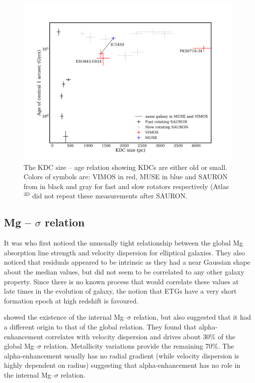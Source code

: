 		\begin{figure}
			\centering
			\includegraphics[width=.7\textwidth]{chapter4/KDC_size_age.png}
			\caption[KDC dichotomy]{The KDC size -- age relation showing KDCs are either old or small. Colors of symbols are: VIMOS in red, MUSE in blue and SAURON from \citet{Kuntschner2010} in black and gray for fast and slow rotators respectively (Atlas$^\text{3D}$ did not repeat these measurements after SAURON.}
			\label{fig:KDC}
		\end{figure}


	\subsection{Mg -- $\sigma$ relation}
		\label{subsec:Mgsigma}

		It was \citet{Bender1993} who first noticed the unusually tight relationship between the global Mg absorption line strength and velocity dispersion for elliptical galaxies. They also noticed that residuals appeared to be intrinsic as they had a near Gaussian shape about the median values, but did not seem to be correlated to any other galaxy property. Since there is no known process that would correlate these values at late times in the evolution of galaxy, the notion that ETGs have a very short formation epoch at high redshift is favoured. 

		\citet{Mehlert2003} showed the existence of the internal Mg--$\mathrm{\sigma}$ relation, but also suggested that it had a different origin to that of the global relation. They found that alpha-enhancement correlates with velocity dispersion and drives about 30\% of the global Mg--$\sigma$ relation. Metallicity variations provide the remaining 70\%. The alpha-enhancement usually has no radial gradient (while velocity dispersion is highly dependent on radius) suggesting that alpha-enhancement has no role in the internal Mg--$\sigma$ relation. 


